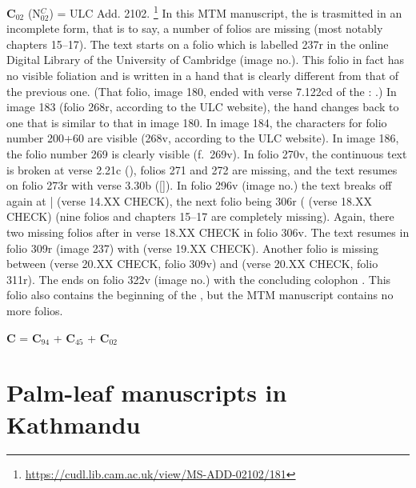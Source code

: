 \documentclass[11pt]{article} %
\begin{document}
{\large\textbf{C$_{\scriptscriptstyle 02}$} 
(N$^{\scriptscriptstyle C}_{\scriptscriptstyle 02}$)  =  
ULC Add. 2102.%
     \footnote{\url{https://cudl.lib.cam.ac.uk/view/MS-ADD-02102/181}}
In this MTM manuscript, the  is trasmitted in an incomplete form, that is to say, 
a number of folios are missing (most notably chapters 15--17). The text starts on a folio which is labelled 237r in 
the online Digital Library of the University of Cambridge (image no.). This folio in fact has no visible 
foliation and is written in a hand that is clearly different from that of the previous one.
(That folio, image 180, ended with verse 7.122cd of the :
.)
In image 183 (folio 268r, according to the ULC website), the hand changes back to one that is similar to that 
in image 180. In image 184, the characters for folio number 200+60 are visible (268v, according to the ULC website).
In image 186, the folio number 269 is clearly visible (f.\ 269v). In folio 270v, the continuous text is broken at
verse 2.21c (), folios 271 and 272 are missing, and the text resumes on folio 273r with verse 3.30b 
([]). In folio 296v (image no.) the text breaks off again at 
 |  (verse 14.XX CHECK), the next folio being 306r ( 
(verse 18.XX CHECK) (nine folios and chapters 15--17 are completely missing). 
Again, there two missing folios after  in
verse 18.XX CHECK in folio 306v. The text resumes in folio 309r (image 237) with 
(verse 19.XX CHECK). Another folio is missing between  (verse 20.XX CHECK, folio 309v) 
and  (verse 20.XX CHECK, folio 311r). The  ends on folio 322v 
(image no.) with the concluding colophon . This folio also contains the beginning
of the , but the MTM manuscript contains no more folios.

\medskip

{\large\textbf{C} } = 
{\large\textbf{C$_{\scriptscriptstyle 94}$}}
+
{\large\textbf{C$_{\scriptscriptstyle 45}$}} 
+
{\large\textbf{C$_{\scriptscriptstyle 02}$} }







\section{Palm-leaf manuscripts in Kathmandu}

}
\end{document}
